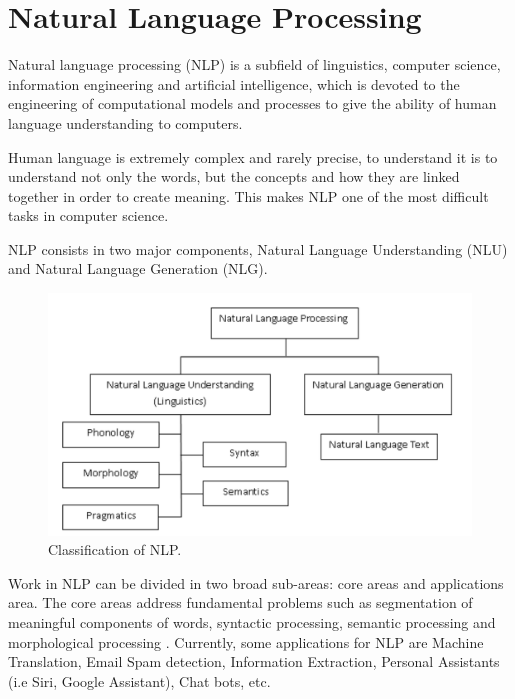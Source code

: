 \cleardoublepage


\chapter{Natural Language Processing}


Natural language processing (NLP) is a subfield of linguistics, computer science, information engineering and artificial intelligence, which is devoted to the engineering of computational models and processes to give the ability of human language understanding to computers. \cite{Khurana2018}  \par

Human language is extremely complex and rarely precise, to understand it is to understand not only the words, but the concepts and how they are linked together in order to create meaning. This makes NLP one of the most difficult tasks in computer science. \par

NLP consists in two major components, Natural Language Understanding (NLU) and Natural Language Generation (NLG).  \par

\begin{figure}[htb]
    \centering
    \includegraphics[scale = 0.25]{Sections/3StateOfTheArt/3_images/NLP_diagram.png}
    \caption{Classification of NLP. \cite{Khurana2018}}   
\end{figure}



Work in NLP can be divided in two broad sub-areas: core areas and applications area. The core areas address fundamental problems such as segmentation of meaningful components of words, syntactic processing, semantic processing and morphological processing \cite{Otter2018}. Currently, some applications for NLP are Machine Translation, Email Spam detection, Information Extraction, Personal Assistants (i.e Siri, Google Assistant), Chat bots, etc.  \par 


